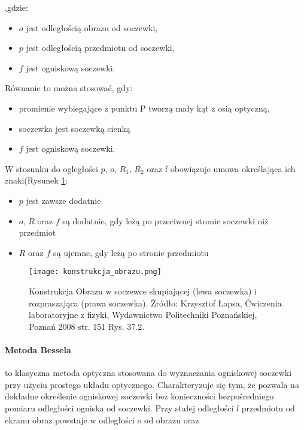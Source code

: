 \documentclass{article}
\begin{document}
,gdzie:
\begin{itemize}
    \item $o$ jest odległością obrazu od soczewki,
    \item $p$ jest odległością przedmiotu od soczewki, 
    \item $f$ jest ogniskową soczewki.
\end{itemize}

Równanie to można stosować, gdy:

\renewcommand{\labelitemi}{\textbullet}
\begin{itemize}
    \item promienie wybiegające z punktu P tworzą mały kąt z osią optyczną,
    \item soczewka jest soczewką cienką
    \item $f$ jest ogniskową soczewki.
\end{itemize}

W stosunku do ogległości $p$, $o$, $R_1$, $R_2$ oraz f obowiązuje umowa określająca ich znaki(Rysunek \ref{fig:konstrukcja}:

\begin{itemize}
    \item $p$ jest zawsze dodatnie 
    \item $o$, $R$ oraz $f$ są dodatnie, gdy leżą po przeciwnej stronie soczewki niż przedmiot
    \item $R$ oraz $f$ są ujemne, gdy leżą po stronie przedmiotu
\end{itemize}

\begin{figure}[htbp]
    \centering
    \texttt{[image: konstrukcja\_obrazu.png]}
    \caption{Konstrukcja Obrazu w soczewce skupiającej (lewa soczewka) i rozpraszająca (prawa soczewka). Źródło: Krzysztof Łapsa, Ćwiczenia laboratoryjne z fizyki, Wydawnictwo Politechniki Poznańskiej, Poznań 2008 str. 151 Rys. 37.2.}
    \label{fig:konstrukcja}
\end{figure}

\paragraph{Metoda Bessela}to klasyczna metoda optyczna stosowana do wyznaczania ogniskowej soczewki przy użyciu prostego układu optycznego. Charakteryzuje się tym, że pozwala na dokładne określenie ogniskowej soczewki bez konieczności bezpośredniego pomiaru odległości ogniska od soczewki. Przy stałej odległości $l$ przedmiotu od ekranu obraz powstaje w odległości $o$ od obrazu oraz 
\end{document}
